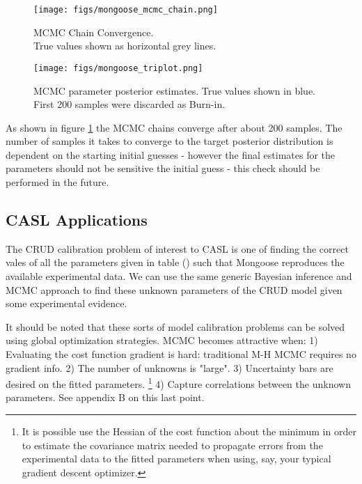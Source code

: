 \documentclass[10pt,a4paper]{report}
\begin{document}
\begin{figure}
    \centering
    \begin{minipage}{.5\textwidth}
        \centering
        \texttt{[image: figs/mongoose\_mcmc\_chain.png]}
        \caption{MCMC Chain Convergence.  \\
            True values
        shown as horizontal grey lines. \label{fig:mg_chain}}
    \end{minipage}%
    \begin{minipage}{.5\textwidth}
        \centering
        \texttt{[image: figs/mongoose\_triplot.png]}
        \caption{MCMC parameter posterior estimates. True values shown in blue. First 200 samples were discarded as Burn-in.}
    \end{minipage}
\end{figure}

As shown in figure \ref{fig:mg_chain} the MCMC chains converge after about 200 samples.  The number of samples it takes to converge to the target posterior distribution is dependent on the starting initial guesses - however the final estimates for the parameters should not be sensitive the initial guess - this check should be performed in the future.

\subsection{CASL Applications}

The CRUD calibration problem of interest to CASL is one of finding the correct vales of all the parameters given in table () such that Mongoose reproduces the available experimental data.
We can use the same generic Bayesian inference and MCMC approach to find these unknown parameters of the CRUD model given some experimental evidence.

It should be noted that these sorts of model calibration problems can be solved using global optimization strategies.  MCMC becomes attractive when: 1) Evaluating the cost function gradient is hard: traditional M-H MCMC requires no gradient info. 2) The number of unknowns is "large". 3) Uncertainty bars are desired on the fitted parameters. \footnote{It is possible use the Hessian of the cost function about the minimum in order to estimate the covariance matrix needed to propagate errors from the experimental data to the fitted parameters when using, say, your typical gradient descent optimizer.}
 4) Capture correlations between the unknown parameters.  See appendix B on this last point.
\end{document}
